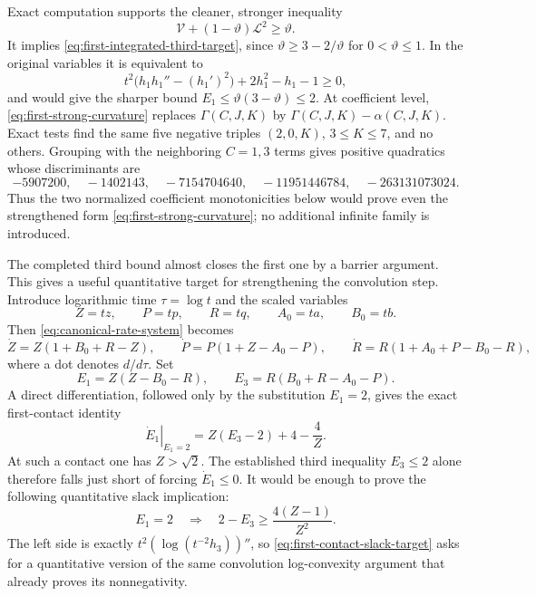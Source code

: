 \documentclass[11pt]{article}
\theoremstyle{remark}
\begin{document}
Exact computation supports the cleaner, stronger inequality
\begin{equation}\label{eq:first-integrated-third-strong}
 \mathcal V+(1-\vartheta)\mathcal L^2\geq\vartheta.
\end{equation}
It implies \eqref{eq:first-integrated-third-target}, since
$\vartheta\geq3-2/\vartheta$ for $0<\vartheta\leq1$.  In the original
variables it is equivalent to
\begin{equation}\label{eq:first-strong-curvature}
 t^2\bigl(h_1h_1''-(h_1')^2\bigr)+2h_1^2-h_1-1\geq0,
\end{equation}
and would give the sharper bound
$E_1\leq\vartheta(3-\vartheta)\leq2$.
At coefficient level, \eqref{eq:first-strong-curvature} replaces
$\Gamma(C,J,K)$ by $\Gamma(C,J,K)-\alpha(C,J,K)$.  Exact tests find the same
five negative triples $(2,0,K)$, $3\leq K\leq7$, and no others.  Grouping
with the neighboring $C=1,3$ terms gives positive quadratics whose
discriminants are
\[
 -5907200,\quad -1402143,\quad -7154704640,\quad
 -11951446784,\quad -263131073024.
\]
Thus the two normalized coefficient monotonicities below would prove even
the strengthened form \eqref{eq:first-strong-curvature}; no additional
infinite family is introduced.

The completed third bound almost closes the first one by a barrier argument.
This gives a useful quantitative target for strengthening the convolution
step.  Introduce logarithmic time $\tau=\log t$ and the scaled variables
\[
 Z=tz,\qquad P=tp,\qquad R=tq,
 \qquad A_0=ta,\qquad B_0=tb.
\]
Then \eqref{eq:canonical-rate-system} becomes
\[
 \dot Z=Z(1+B_0+R-Z),\qquad
 \dot P=P(1+Z-A_0-P),\qquad
 \dot R=R(1+A_0+P-B_0-R),
\]
where a dot denotes $d/d\tau$.  Set
\[
 E_1=Z(Z-B_0-R),\qquad
 E_3=R(B_0+R-A_0-P).
\]
A direct differentiation, followed only by the substitution $E_1=2$, gives
the exact first-contact identity
\begin{equation}\label{eq:first-contact-slack}
 \left.\dot E_1\right|_{E_1=2}
 =Z(E_3-2)+4-\frac4Z.
\end{equation}
At such a contact one has $Z>\sqrt2$.  The established third inequality
$E_3\leq2$ alone therefore falls just short of forcing $\dot E_1\leq0$.
It would be enough to prove the following quantitative slack implication:
\begin{equation}\label{eq:first-contact-slack-target}
 E_1=2\quad\Longrightarrow\quad
 2-E_3\geq\frac{4(Z-1)}{Z^2}.
\end{equation}
The left side is exactly
$t^2(\log(t^{-2}h_3))''$, so
\eqref{eq:first-contact-slack-target} asks for a quantitative version of the
same convolution log-convexity argument that already proves its
nonnegativity.
\end{document}
